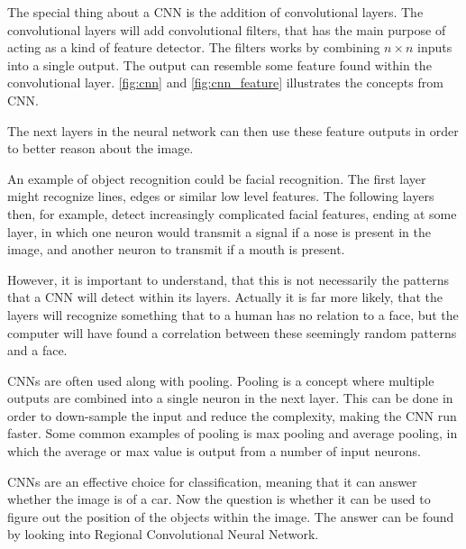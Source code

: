 The special thing about a CNN is the addition of convolutional layers.
The convolutional layers will add convolutional filters, that has the main purpose of acting as a kind of feature detector.
The filters works by combining $n \times n$ inputs into a single output.
The output can resemble some feature found within the convolutional layer.
\autoref{fig:cnn} and \autoref{fig:cnn_feature} illustrates the concepts from CNN.



The next layers in the neural network can then use these feature outputs in order to better reason about the image.

An example of object recognition could be facial recognition.
The first layer might recognize lines, edges or similar low level features.
The following layers then, for example, detect increasingly complicated facial features, ending at some layer, in which one neuron would transmit a signal if a nose is present in the image, and another neuron to transmit if a mouth is present.


However, it is important to understand, that this is not necessarily the patterns that a CNN will detect within its layers.
Actually it is far more likely, that the layers will recognize something that to a human has no relation to a face, but the computer will have found a correlation between these seemingly random patterns and a face.

CNNs are often used along with pooling.
Pooling is a concept where multiple outputs are combined into a single neuron in the next layer.
This can be done in order to down-sample the input and reduce the complexity, making the CNN run faster.
Some common examples of pooling is max pooling and average pooling, in which the average or max value is output from a number of input neurons.

CNNs are an effective choice for classification, meaning that it can answer whether the image is of a car.
Now the question is whether it can be used to figure out the position of the objects within the image.
The answer can be found by looking into Regional Convolutional Neural Network.


